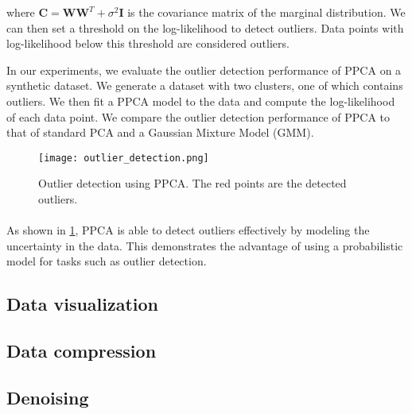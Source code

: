 \documentclass{article}
\begin{document}
where $\mathbf{C} = \mathbf{WW}^T + \sigma^2\mathbf{I}$ is the covariance matrix of the marginal distribution. We can then set a threshold on the log-likelihood to detect outliers. Data points with log-likelihood below this threshold are considered outliers.

In our experiments, we evaluate the outlier detection performance of PPCA on a synthetic dataset. We generate a dataset with two clusters, one of which contains outliers. We then fit a PPCA model to the data and compute the log-likelihood of each data point. We compare the outlier detection performance of PPCA to that of standard PCA and a Gaussian Mixture Model (GMM).

\begin{figure}[H]
    \centering
    \texttt{[image: outlier\_detection.png]}
    \caption{Outlier detection using PPCA. The red points are the detected outliers.}
    \label{fig:outlier_detection}
\end{figure}

\paragraph{} As shown in \cref{fig:outlier_detection}, PPCA is able to detect outliers effectively by modeling the uncertainty in the data. This demonstrates the advantage of using a probabilistic model for tasks such as outlier detection.

\subsection{Data visualization}


\subsection{Data compression}

\subsection{Denoising}





\newpage
\appendix

\section{}
\label{}

\subsection{}
\label{}
\end{document}

